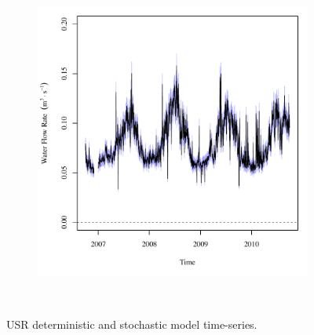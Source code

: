 \begin{linenumbers}
\begin{landscape}
\begin{figure}
\begin{subfigure}{0.7\textwidth}
		\end{subfigure}%
		\begin{subfigure}{0.7\textwidth}
			\centering
			\includegraphics[width=\textwidth]{"Figures/Results_USR/Stochastic/Q WTP"}
		\end{subfigure}\\
		\caption{USR deterministic and stochastic model time-series.}
	\end{figure}
\end{landscape}




\end{linenumbers}
